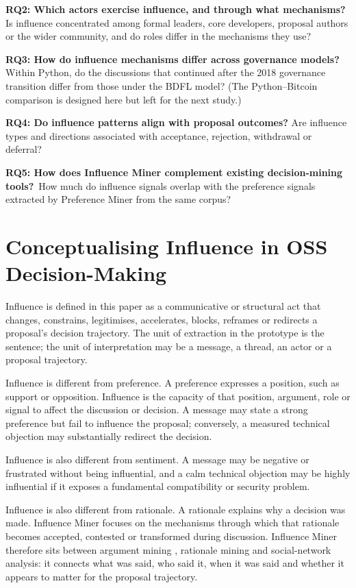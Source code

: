 \documentclass[sigconf,screen]{acmart}
\begin{document}
\textbf{RQ2: Which actors exercise influence, and through what mechanisms?} Is influence concentrated among formal leaders, core developers, proposal authors or the wider community, and do roles differ in the mechanisms they use?

\textbf{RQ3: How do influence mechanisms differ across governance models?} Within Python, do the discussions that continued after the 2018 governance transition differ from those under the BDFL model? (The Python--Bitcoin comparison is designed here but left for the next study.)

\textbf{RQ4: Do influence patterns align with proposal outcomes?} Are influence types and directions associated with acceptance, rejection, withdrawal or deferral?

\textbf{RQ5: How does Influence Miner complement existing decision-mining tools?}\  How much do influence signals overlap with the preference signals extracted by Preference Miner from the same corpus?

\section{Conceptualising Influence in OSS Decision-Making}

Influence is defined in this paper as a communicative or structural act that changes, constrains, legitimises, accelerates, blocks, reframes or redirects a proposal's decision trajectory. The unit of extraction in the prototype is the sentence; the unit of interpretation may be a message, a thread, an actor or a proposal trajectory.

Influence is different from preference. A preference expresses a position, such as support or opposition. Influence is the capacity of that position, argument, role or signal to affect the discussion or decision. A message may state a strong preference but fail to influence the proposal; conversely, a measured technical objection may substantially redirect the decision.

Influence is also different from sentiment. A message may be negative or frustrated without being influential, and a calm technical objection may be highly influential if it exposes a fundamental compatibility or security problem.

Influence is also different from rationale. A rationale explains why a decision was made. Influence Miner focuses on the mechanisms through which that rationale becomes accepted, contested or transformed during discussion. Influence Miner therefore sits between argument mining \cite{argumentMining}, rationale mining and social-network analysis: it connects what was said, who said it, when it was said and whether it appears to matter for the proposal trajectory.
\end{document}
